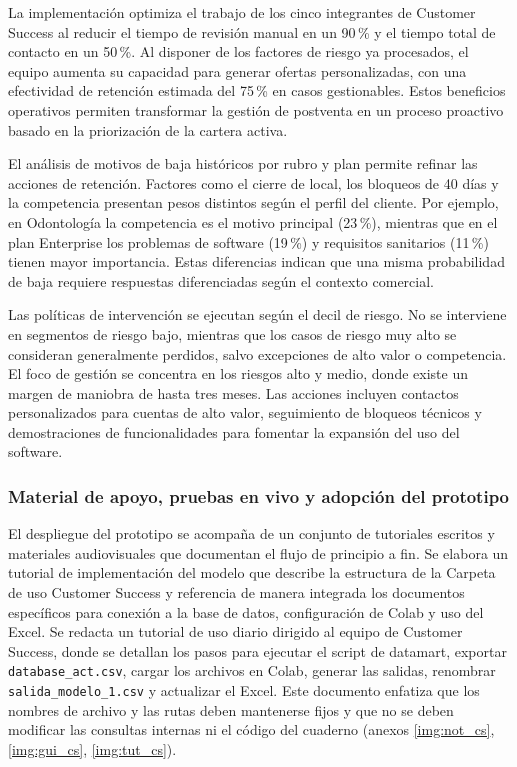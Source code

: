 La implementación optimiza el trabajo de los cinco integrantes de Customer Success al reducir el tiempo de revisión manual en un 90\,\% y el tiempo total de contacto en un 50\,\%. Al disponer de los factores de riesgo ya procesados, el equipo aumenta su capacidad para generar ofertas personalizadas, con una efectividad de retención estimada del 75\,\% en casos gestionables. Estos beneficios operativos permiten transformar la gestión de postventa en un proceso proactivo basado en la priorización de la cartera activa.

El análisis de motivos de baja históricos por rubro y plan permite refinar las acciones de retención. Factores como el cierre de local, los bloqueos de 40 días y la competencia presentan pesos distintos según el perfil del cliente. Por ejemplo, en Odontología la competencia es el motivo principal (23\,\%), mientras que en el plan Enterprise los problemas de software (19\,\%) y requisitos sanitarios (11\,\%) tienen mayor importancia. Estas diferencias indican que una misma probabilidad de baja requiere respuestas diferenciadas según el contexto comercial.

Las políticas de intervención se ejecutan según el decil de riesgo. No se interviene en segmentos de riesgo bajo, mientras que los casos de riesgo muy alto se consideran generalmente perdidos, salvo excepciones de alto valor o competencia. El foco de gestión se concentra en los riesgos alto y medio, donde existe un margen de maniobra de hasta tres meses. Las acciones incluyen contactos personalizados para cuentas de alto valor, seguimiento de bloqueos técnicos y demostraciones de funcionalidades para fomentar la expansión del uso del software.


\subsubsection{Material de apoyo, pruebas en vivo y adopción del prototipo}

El despliegue del prototipo se acompaña de un conjunto de tutoriales escritos y materiales audiovisuales que documentan el flujo de principio a fin. Se elabora un tutorial de implementación del modelo que describe la estructura de la Carpeta de uso Customer Success y referencia de manera integrada los documentos específicos para conexión a la base de datos, configuración de Colab y uso del Excel. Se redacta un tutorial de uso diario dirigido al equipo de Customer Success, donde se detallan los pasos para ejecutar el script de datamart, exportar \texttt{database\_act.csv}, cargar los archivos en Colab, generar las salidas, renombrar \texttt{salida\_modelo\_1.csv} y actualizar el Excel. Este documento enfatiza que los nombres de archivo y las rutas deben mantenerse fijos y que no se deben modificar las consultas internas ni el código del cuaderno (anexos \ref{img:not_cs}, \ref{img:gui_cs}, \ref{img:tut_cs}).

